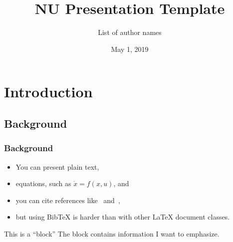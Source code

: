 \documentclass[aspectratio=169,9pt,xcolor=dvipsnames]{beamer}
\title[Presentation]{NU Presentation Template} %
\author[A. Uthor]{List of author names} %
\institute[NU] %
{
Northwestern University \\ %
\medskip
\textit{author@institution.edu} %
}
\date{May 1, 2019} %
\begin{document}
\begin{frame}
\titlepage %
\end{frame}




\section{Introduction} %
\subsection{Background}
\begin{frame}
\frametitle{Background}

\begin{itemize}
\item You can present plain text,
\item equations, such as $\dot{x} = f\left(x,u\right)$, and
\item you can cite references like~\cite{Aguilar} and~\cite{Hubicki},
\item but using BibTeX is harder than with other LaTeX document classes.
\end{itemize}


\begin{block}{This is a ``block''}
The block contains information I want to emphasize.
\end{block}
\end{frame}
\end{document}
